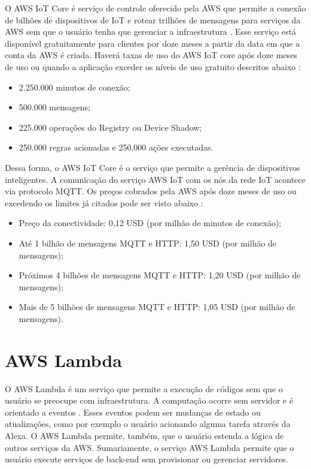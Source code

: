 O AWS IoT Core é serviço de controle oferecido pela AWS que permite a conexão de bilhões de dispositivos de IoT e rotear trilhões de mensagens para serviços da AWS sem que o usuário tenha que gerenciar a infraestrutura \cite{ref:020}. Esse serviço está disponível gratuitamente para clientes por doze meses a partir da data em que a conta da AWS é criada. Haverá taxas de uso do AWS IoT core após doze meses de uso ou quando a aplicação exceder os níveis de uso gratuito descritos abaixo \cite{ref:021}:

\begin{itemize}
    \item 2.250.000 minutos de conexão;
    \item 500.000 mensagens;
    \item 225.000 operações do Registry ou Device Shadow;
    \item 250.000 regras acionadas e 250.000 ações executadas.
\end{itemize}

Dessa forma, o AWS IoT Core é o serviço que permite a gerência de dispositivos inteligentes. A comunicação do serviço AWS IoT com os nós da rede IoT acontece via protocolo MQTT. Os preços cobrados pela AWS após doze meses de uso ou excedendo os limites já citados pode ser visto abaixo \cite{ref:021}:

\begin{itemize}
    \item Preço da conectividade: 0,12 USD (por milhão de minutos de conexão);
    \item Até 1 bilhão de mensagens MQTT e HTTP: 1,50 USD (por milhão de mensagens);
    \item Próximos 4 bilhões de mensagens MQTT e HTTP: 1,20 USD (por milhão de mensagens);
    \item Mais de 5 bilhões de mensagens MQTT e HTTP: 1,05 USD (por milhão de mensagens).
\end{itemize}

\section{AWS Lambda}\label{section:aws_lambda}

O AWS Lambda é um serviço que permite a execução de códigos sem que o usuário se preocupe com infraestrutura. A computação ocorre sem servidor e é orientado a eventos \cite{ref:022}. Esses eventos podem ser mudanças de estado ou atualizações, como por exemplo o usuário acionando alguma tarefa através da Alexa. O AWS Lambda permite, também, que o usuário estenda a lógica de outros serviços da AWS. Sumariamente, o serviço AWS Lambda permite que o usuário execute serviços de back-end sem provisionar ou gerenciar servidores.

